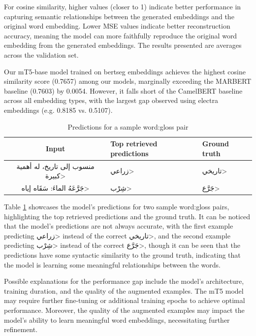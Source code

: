 \documentclass[12.5pt]{article}
\begin{document}
For cosine similarity, higher values (closer to 1) indicate better performance in capturing semantic relationships between the generated embeddings and the original word embedding. Lower MSE values indicate better reconstruction accuracy, meaning the model can more faithfully reproduce the original word embedding from the generated embeddings. The results presented are averages across the validation set.

Our mT5-base model trained on bertseg embeddings achieves the highest cosine similarity score (0.7657) among our models, marginally exceeding the MARBERT baseline (0.7603) by 0.0054. However, it falls short of the CamelBERT baseline across all embedding types, with the largest gap observed using electra embeddings (e.g. 0.8185 vs. 0.5107).

\begin{table}[H]
    \centering
    \caption{Predictions for a sample word:gloss pair}
    \label{table:results-sample}
    \renewcommand{\arraystretch}{1.5}%
    \begin{tabularx}{\textwidth}{|c|X|X|}
        \hline
        \textbf{Input} & \textbf{Top retrieved predictions} & \textbf{Ground truth} \\
        \hline
        \<منسوب إلى تاريخ، له أهمية كبيرة> & \<زراعي> & \<تاريخي> \\
        \hline
        \<جَرَّعَهُ الماءَ: سَقَاه إياه> & \<شِرْب> & \<جَرَّع> \\
        \hline
    \end{tabularx}
\end{table}

Table \ref{table:results-sample} showcases the model's predictions for two sample word:gloss pairs, highlighting the top retrieved predictions and the ground truth. It can be noticed that the model's predictions are not always accurate, with the first example predicting \<زراعي> instead of the correct \<تاريخي>, and the second example predicting \<شِرْب> instead of the correct \<جَرَّع>, though it can be seen that the predictions have some syntactic similarity to the ground truth, indicating that the model is learning some meaningful relationships between the words.

Possible explanations for the performance gap include the model's architecture, training duration, and the quality of the augmented examples. The mT5 model may require further fine-tuning or additional training epochs to achieve optimal performance. Moreover, the quality of the augmented examples may impact the model's ability to learn meaningful word embeddings, necessitating further refinement.
\end{document}
